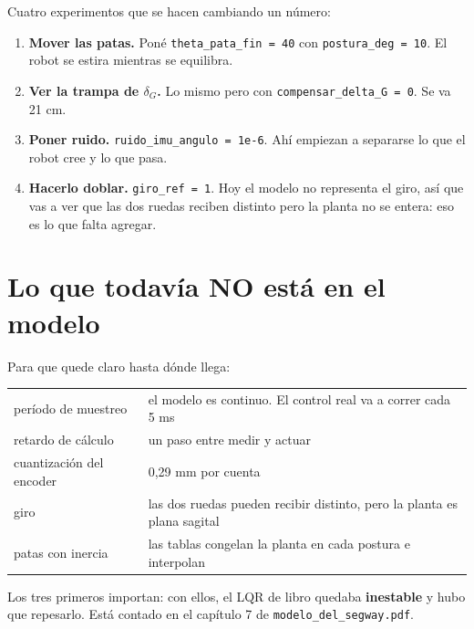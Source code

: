 \documentclass[11pt,a4paper]{article}
\begin{document}
\begin{probar}
Cuatro experimentos que se hacen cambiando un número:

\begin{enumerate}[leftmargin=1.4em,itemsep=2pt]
\item \textbf{Mover las patas.} Poné \texttt{theta\_pata\_fin = 40} con
      \texttt{postura\_deg = 10}. El robot se estira mientras se equilibra.
\item \textbf{Ver la trampa de $\delta_G$.} Lo mismo pero con
      \texttt{compensar\_delta\_G = 0}. Se va 21 cm.
\item \textbf{Poner ruido.} \texttt{ruido\_imu\_angulo = 1e-6}. Ahí empiezan a separarse lo que el
      robot cree y lo que pasa.
\item \textbf{Hacerlo doblar.} \texttt{giro\_ref = 1}. Hoy el modelo no representa el giro, así
      que vas a ver que las dos ruedas reciben distinto pero la planta no se entera: eso es lo que
      falta agregar.
\end{enumerate}
\end{probar}

\section*{Lo que todavía NO está en el modelo}

Para que quede claro hasta dónde llega:

\begin{center}
\small
\begin{tabular}{@{}lp{10.6cm}@{}}
\toprule
período de muestreo & el modelo es continuo. El control real va a correr cada 5 ms \\
retardo de cálculo & un paso entre medir y actuar \\
cuantización del encoder & 0,29 mm por cuenta \\
giro & las dos ruedas pueden recibir distinto, pero la planta es plana sagital \\
patas con inercia & las tablas congelan la planta en cada postura e interpolan \\
\bottomrule
\end{tabular}
\end{center}

Los tres primeros importan: con ellos, el LQR de libro quedaba \textbf{inestable} y hubo que
repesarlo. Está contado en el capítulo 7 de \texttt{modelo\_del\_segway.pdf}.
\end{document}
